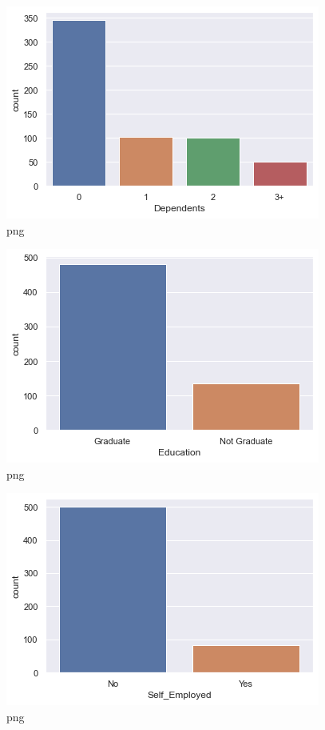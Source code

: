 \documentclass[]{article}
\begin{document}
\begin{figure}
\centering
\includegraphics{notebook_files/notebook_21_2.png}
\caption{png}
\end{figure}

\begin{figure}
\centering
\includegraphics{notebook_files/notebook_21_3.png}
\caption{png}
\end{figure}

\begin{figure}
\centering
\includegraphics{notebook_files/notebook_21_4.png}
\caption{png}
\end{figure}
\end{document}
